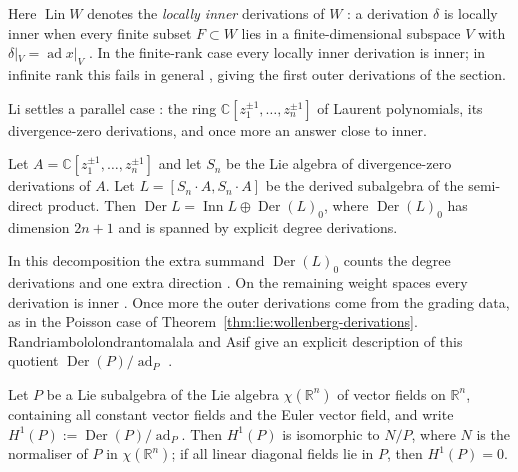 Here $\operatorname{Lin} W$ denotes the \emph{locally inner}
derivations of $W$ \cite[p.~47]{IkedaKawamoto1990}:
a derivation $\delta$ is locally inner when every finite subset
$F\subset W$ lies in a finite-dimensional subspace $V$ with
$\delta|_{V}=\operatorname{ad} x|_{V}$ \cite[p.~47]{IkedaKawamoto1990}.
In the finite-rank case every locally
inner derivation is inner; in infinite rank this fails in general
\cite[Remark, p.~55]{IkedaKawamoto1990}, giving the first outer
derivations of the section.

Li settles a parallel case \cite[Theorem~3.6, p.~9]{Li2019}: the ring
$\mathbb{C}[z_{1}^{\pm 1},\dots,z_{n}^{\pm 1}]$ of Laurent polynomials,
its divergence-zero derivations, and once more an answer close to inner.

\begin{theorem}[{\cite[Theorem~3.6, p.~9]{Li2019}}]\label{thm:lie:li-derivations}
Let $A=\mathbb{C}[z_{1}^{\pm 1},\dots,z_{n}^{\pm 1}]$ and let $S_{n}$ be
the Lie algebra of divergence-zero derivations of $A$.  Let
$L=[S_{n}\!\cdot\!A,S_{n}\!\cdot\!A]$ be the derived subalgebra of the
semi-direct product.  Then
$\operatorname{Der} L=\operatorname{Inn} L\oplus\operatorname{Der}(L)_{0}$,
where $\operatorname{Der}(L)_{0}$ has dimension $2n+1$ and is spanned by
explicit degree derivations.
\end{theorem}

In this decomposition the extra summand $\operatorname{Der}(L)_{0}$
counts the degree derivations and one extra direction
\cite[Theorem~3.6, p.~9]{Li2019}.  On the remaining weight spaces every
derivation is inner \cite[Theorem~3.6, p.~9]{Li2019}.  Once more the outer
derivations come from the grading data, as in the Poisson case of
Theorem~\ref{thm:lie:wollenberg-derivations}.
Randriambololondrantomalala and Asif give an explicit description of
this quotient $\operatorname{Der}(P)/\operatorname{ad}_{P}$
\cite[Theorem~2.4, p.~53]{RandriambololondrantomalalaAsif2022}.

\begin{theorem}\label{thm:lie:h1-vector-fields}
Let $P$ be a Lie subalgebra of the Lie algebra $\chi(\mathbb{R}^{n})$ of
vector fields on $\mathbb{R}^{n}$, containing all constant vector fields
and the Euler vector field, and write
$H^{1}(P):=\operatorname{Der}(P)/\operatorname{ad}_{P}$.  Then
$H^{1}(P)$ is isomorphic to $N/P$, where $N$ is the normaliser of $P$ in
$\chi(\mathbb{R}^{n})$; if all linear diagonal fields lie in $P$, then
$H^{1}(P)=0$.
\end{theorem}

